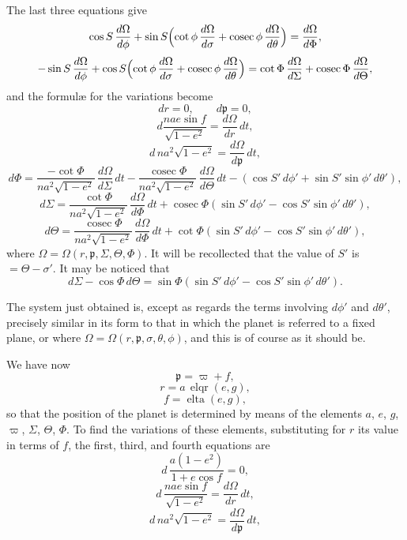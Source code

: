 \documentclass[11pt]{article}
\providecommand{\elqr}{\operatorname{elqr}}
\providecommand{\elta}{\operatorname{elta}}
\begin{document}
\bigskip
{} The last three equations give
\[
\cos S\,\frac{d\Omega}{d\phi} + \sin S\Bigl(\cot\phi\,\frac{d\Omega}{d\sigma} + \operatorname{cosec}\phi\,\frac{d\Omega}{d\theta}\Bigr) = \frac{d\Omega}{d\Phi},
\]
\[
-\sin S\,\frac{d\Omega}{d\phi} + \cos S\Bigl(\cot\phi\,\frac{d\Omega}{d\sigma} + \operatorname{cosec}\phi\,\frac{d\Omega}{d\theta}\Bigr) = \cot\Phi\,\frac{d\Omega}{d\Sigma} + \operatorname{cosec}\Phi\,\frac{d\Omega}{d\Theta},
\]
and the formul\ae{} for the variations become
\[
dr = 0,\qquad d\mathfrak{p} = 0,
\]
\[
d\frac{nae\sin f}{\sqrt{1-e^{2}}} = \frac{d\Omega}{dr}\,dt,
\]
\[
d\,na^{2}\sqrt{1-e^{2}} = \frac{d\Omega}{d\mathfrak{p}}\,dt,
\]
\[
d\Phi = \frac{-\cot\Phi}{na^{2}\sqrt{1-e^{2}}}\,\frac{d\Omega}{d\Sigma}\,dt - \frac{\operatorname{cosec}\Phi}{na^{2}\sqrt{1-e^{2}}}\,\frac{d\Omega}{d\Theta}\,dt - (\cos S'\,d\phi' + \sin S'\sin\phi'\,d\theta'),
\]
\[
d\Sigma = \frac{\cot\Phi}{na^{2}\sqrt{1-e^{2}}}\,\frac{d\Omega}{d\Phi}\,dt + \operatorname{cosec}\Phi(\sin S'\,d\phi' - \cos S'\sin\phi'\,d\theta'),
\]
\[
d\Theta = \frac{\operatorname{cosec}\Phi}{na^{2}\sqrt{1-e^{2}}}\,\frac{d\Omega}{d\Phi}\,dt + \cot\Phi(\sin S'\,d\phi' - \cos S'\sin\phi'\,d\theta'),
\]
where $\Omega = \Omega(r,\mathfrak{p},\Sigma,\Theta,\Phi)$. It will be recollected that the value of $S'$ is $=\Theta-\sigma'$. It may be noticed that
\[
d\Sigma - \cos\Phi\,d\Theta = \sin\Phi(\sin S'\,d\phi' - \cos S'\sin\phi'\,d\theta').
\]

\medskip
\noindent The system just obtained is, except as regards the terms involving $d\phi'$ and $d\theta'$, precisely similar in its form to that in which the planet is referred to a fixed plane, or where $\Omega = \Omega(r,\mathfrak{p},\sigma,\theta,\phi)$, and this is of course as it should be.

\medskip
\noindent We have now
\[
\mathfrak{p} = \varpi + f,
\]
\[
r = a\,\elqr(e,g),
\]
\[
f = \elta(e,g),
\]
so that the position of the planet is determined by means of the elements $a$, $e$, $g$, $\varpi$, $\Sigma$, $\Theta$, $\Phi$. To find the variations of these elements, substituting for $r$ its value in terms of $f$, the first, third, and fourth equations are
\[
d\,\frac{a(1-e^{2})}{1+e\cos f} = 0,
\]
\[
d\,\frac{nae\sin f}{\sqrt{1-e^{2}}} = \frac{d\Omega}{dr}\,dt,
\]
\[
d\,na^{2}\sqrt{1-e^{2}} = \frac{d\Omega}{d\mathfrak{p}}\,dt,
\]
\end{document}

